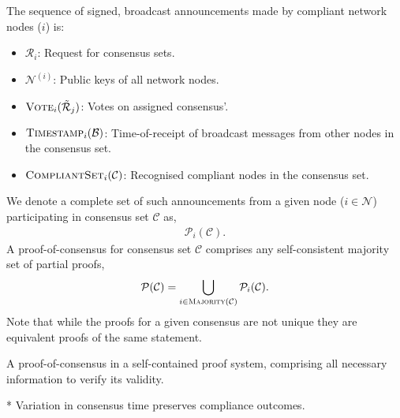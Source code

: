 The sequence of signed, broadcast announcements made by compliant network nodes ($i$) is:
\begin{itemize}
	\item $\mathcal{R}_i$: Request for consensus sets.
	\item $\mathcal{N}^{(i)}$: Public keys of all network nodes.
	\item $\textsc{Vote}_i(\tilde{\mathcal{R}}_j)$: Votes on assigned consensus'.
	\item $\textsc{Timestamp}_i(\mathcal{B})$: Time-of-receipt of broadcast messages from other nodes in the consensus set.
	\item $\textsc{CompliantSet}_i(\mathcal{C})$: Recognised compliant nodes in the consensus set.
\end{itemize}
We denote a complete set of such announcements from a given node ($i\in\mathcal{N}$) participating in consensus set $\mathcal{C}$ as,
\begin{align}
	\mathcal{P}_i(\mathcal{C}).
\end{align}
A proof-of-consensus for consensus set $\mathcal{C}$ comprises any self-consistent majority set of partial proofs,
\begin{align}
	\mathcal{P}(\mathcal{C}) = \bigcup_{i\in\textsc{Majority}(\mathcal{C})} \mathcal{P}_i(\mathcal{C}).
\end{align}
Note that while the proofs for a given consensus are not unique they are equivalent proofs of the same statement.

A proof-of-consensus in a self-contained proof system, comprising all necessary information to verify its validity.

* Variation in consensus time preserves compliance outcomes.

